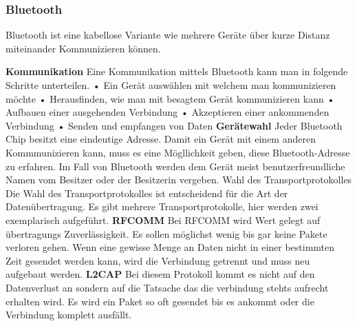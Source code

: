 \subsubsection{Bluetooth}
\label{subsec:Bluetooth}
Bluetooth ist eine kabellose Variante wie mehrere Geräte über kurze Distanz miteinander Kommunizieren können.
 

\textbf{Kommunikation\nextline}
Eine Kommunikation mittels Bluetooth kann man in folgende Schritte unterteilen.
\nextline
•	Ein Gerät auswählen mit welchem man kommunizieren möchte
\nextline
•	Herausfinden, wie man mit besagtem Gerät kommunizieren kann
\nextline
•	Aufbauen einer ausgehenden Verbindung
\nextline
•	Akzeptieren einer ankommenden Verbindung
\nextline
•	Senden und empfangen von Daten
\nextline
\textbf{Gerätewahl\nextline}
Jeder Bluetooth Chip besitzt eine eindeutige Adresse. Damit ein Gerät mit einem anderen Kommmunizieren kann, muss es eine Mögllichkeit geben, diese Bluetooth-Adresse zu erfahren. Im Fall von Bluetooth werden dem Gerät meist benutzerfreundliche Namen vom Besitzer oder der Besitzerin vergeben.
Wahl des Transportprotokolles
Die Wahl des Transportprotokolles ist entscheidend für die Art der Datenübertragung. Es gibt mehrere Transportprotokolle, hier werden zwei exemplarisch aufgeführt.
\nextline
\textbf{RFCOMM\nextline}
Bei RFCOMM wird Wert gelegt auf übertragungs Zuverlässigkeit. Es sollen möglichst wenig bis gar keine Pakete verloren gehen. Wenn eine gewisse Menge an Daten nicht in einer bestimmten Zeit gesendet werden kann, wird die Verbindung getrennt und muss neu aufgebaut werden.
\nextline
\textbf{L2CAP\nextline}
Bei diesem Protokoll kommt es nicht auf den Datenverlust an sondern auf die Tatsache das die verbindung stehts aufrecht erhalten wird. Es wird ein Paket so oft gesendet bis es ankommt oder die Verbindung komplett ausfällt.


\clearpage %